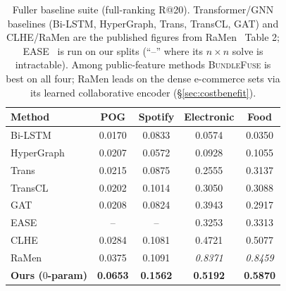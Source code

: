\begin{table}[t]\centering\small
\caption{Fuller baseline suite (full-ranking R@20). Transformer/GNN baselines (Bi-LSTM, HyperGraph, Trans, TransCL,
GAT) and CLHE/RaMen are the published figures from RaMen~\cite{ramen} Table 2; EASE~\cite{steck2019} is run on our
splits (``--'' where its $n\times n$ solve is intractable). Among public-feature methods \textsc{BundleFuse} is best
on all four; RaMen leads on the dense e-commerce sets via its learned collaborative encoder (\S\ref{sec:costbenefit}).}
\label{tab:suite}
\setlength{\tabcolsep}{4.5pt}
\begin{tabular}{lcccc}
\toprule
Method & POG & Spotify & Electronic & Food \\
\midrule
Bi-LSTM           & 0.0170 & 0.0833 & 0.0574 & 0.0350 \\
HyperGraph        & 0.0207 & 0.0572 & 0.0928 & 0.1055 \\
Trans             & 0.0215 & 0.0875 & 0.2555 & 0.3137 \\
TransCL           & 0.0202 & 0.1014 & 0.3050 & 0.3088 \\
GAT               & 0.0208 & 0.0824 & 0.3943 & 0.2917 \\
EASE              & --     & --     & 0.3253 & 0.3313 \\
CLHE              & 0.0284 & 0.1081 & 0.4721 & 0.5077 \\
RaMen              & 0.0375 & 0.1091 & \textit{0.8371} & \textit{0.8459} \\
\textbf{Ours ($0$-param)} & \textbf{0.0653} & \textbf{0.1562} & \textbf{0.5192} & \textbf{0.5870} \\
\bottomrule
\end{tabular}
\end{table}

